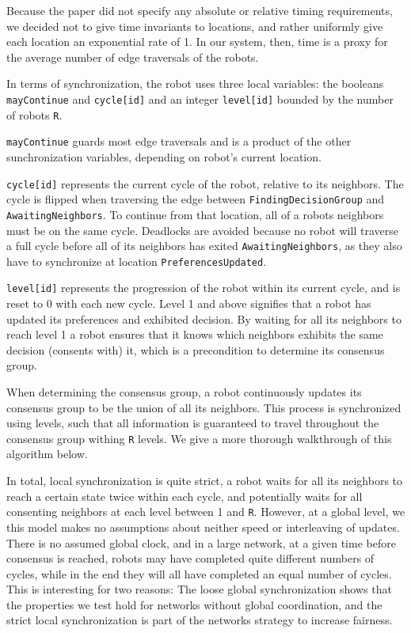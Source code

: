 Because the paper did not specify any absolute or relative timing requirements, we decided not to give time invariants to locations, and rather uniformly give each location an exponential rate of 1. In our system, then, time is a proxy for the average number of edge traversals of the robots.

In terms of synchronization, the robot uses three local variables: the booleans \texttt{mayContinue} and \texttt{cycle[id]} and an integer \texttt{level[id]} bounded by the number of robots \texttt{R}.

\texttt{mayContinue} guards most edge traversals and is a product of the other sunchronization variables, depending on robot's current location.

\texttt{cycle[id]} represents the current cycle of the robot, relative to its neighbors. The cycle is flipped when traversing the edge between \texttt{FindingDecisionGroup} and \texttt{AwaitingNeighbors}. To continue from that location, all of a robots neighbors must be on the same cycle. Deadlocks are avoided because no robot will traverse a full cycle before all of its neighbors has exited \texttt{AwaitingNeighbors}, as they also have to synchronize at location \texttt{PreferencesUpdated}.

\texttt{level[id]} represents the progression of the robot within its current cycle, and is reset to 0 with each new cycle. Level 1 and above signifies that a robot has updated its preferences and exhibited decision. By waiting for all its neighbors to reach level 1 a robot ensures that it knows which neighbors exhibits the same decision (consents with) it, which is a precondition to determine its consensus group. 

When determining the consensus group, a robot continuously updates its consensus group to be the union of all its neighbors. This process is synchronized using levels, such that all information is guaranteed to travel throughout the consensus group withing \texttt{R} levels. We give a more thorough walkthrough of this algorithm below.

In total, local synchronization is quite strict, a robot waits for all its neighbors to reach a certain state twice within each cycle, and potentially waits for all consenting neighbors at each level between 1 and \texttt{R}. However, at a global level, we this model makes no assumptions about neither speed or interleaving of updates. There is no assumed global clock, and in a large network, at a given time before consensus is reached, robots may have completed quite different numbers of cycles, while in the end they will all have completed an equal number of cycles. 
This is interesting for two reasons: The loose global synchronization shows that the properties we test hold for networks without global coordination, and the strict local synchronization is part of the networks strategy to increase fairness.

